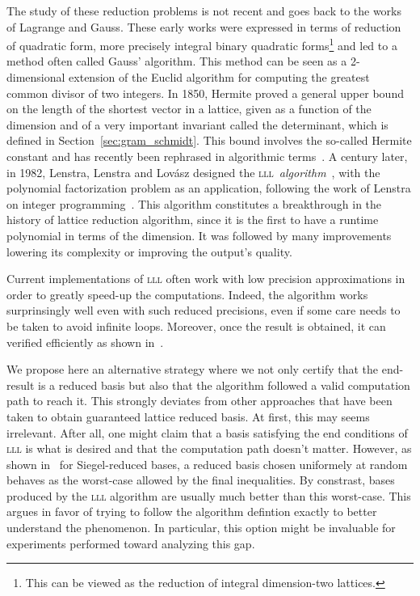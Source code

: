 \documentclass{amsart}
\newcommand{\LLL}{\mbox{\textsc{lll}}}
\theoremstyle{definition}
\begin{document}
The study of these reduction problems is not recent and goes back to
the works of Lagrange and Gauss. These early works were expressed in
terms of reduction of quadratic form, more precisely integral binary
quadratic forms\footnote{This can be viewed as the reduction of
  integral dimension-two lattices.} and led to a
method often called Gauss' algorithm. This method can be seen as a
2-dimensional extension of the Euclid algorithm for computing the
greatest common divisor of two integers.  In 1850, Hermite proved a
general upper bound on the length of the shortest vector in a lattice,
given as a function of the dimension and of a very important invariant
called the determinant, which is defined in
Section~\ref{sec:gram_schmidt}. This bound involves the so-called
Hermite constant and has recently been rephrased in algorithmic
terms~\cite[Hermite's Algorithms]{Nguyen2010}.  A century later, in
1982, Lenstra, Lenstra and Lovász designed the
\LLL~\emph{algorithm}~\cite{LLL82}, with the polynomial factorization
problem as an application, following the work of Lenstra on integer
programming~\cite{Lenstra1983}.  This algorithm constitutes a
breakthrough in the history of lattice reduction algorithm, since it
is the first to have a runtime polynomial in terms of the
dimension. It was followed by many improvements lowering
its complexity or improving the output's quality.  \medskip

Current implementations of \LLL{} often work with low precision
approximations in order to greatly speed-up the computations. Indeed,
the algorithm works surprinsingly well even with such reduced
precisions, even if  some care needs to be taken to avoid infinite
loops. Moreover, once the result is obtained, it can verified
efficiently as shown in~\cite{Villard07}.\medskip

We propose here an alternative strategy where we not only certify that
the end-result is a reduced basis but also that the algorithm followed
a valid computation path to reach it. This strongly deviates from
other approaches that have been taken to obtain guaranteed lattice
reduced basis. At first, this may seems irrelevant. After all, one
might claim that a basis satisfying the end conditions of \LLL{} is what
is desired and that the computation path doesn't matter. However, as
shown in~\cite{KimVenkatesh16} for Siegel-reduced bases, a reduced
basis chosen uniformely at random behaves as the worst-case allowed by
the final inequalities. By constrast, bases produced by the \LLL{}
algorithm are usually much better than this worst-case. This argues in
favor of trying to follow the algorithm defintion exactly to better
understand the phenomenon. In particular, this option might be
invaluable for experiments performed toward analyzing this gap.\medskip
\end{document}
